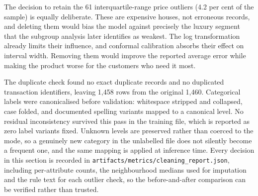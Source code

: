 The decision to retain the 61 interquartile-range price outliers (4.2 per cent of the
sample) is equally deliberate. These are expensive houses, not erroneous records, and
deleting them would bias the model against precisely the luxury segment that the
subgroup analysis later identifies as weakest. The log transformation already limits
their influence, and conformal calibration absorbs their effect on interval width.
Removing them would improve the reported average error while making the product worse
for the customers who need it most.

The duplicate check found no exact duplicate records and no duplicated transaction
identifiers, leaving 1,458 rows from the original 1,460. Categorical labels were
canonicalised before validation: whitespace stripped and collapsed, case folded, and
documented spelling variants mapped to a canonical level. No residual inconsistency
survived this pass in the training file, which is reported as zero label variants
fixed. Unknown levels are preserved rather than coerced to the mode, so a genuinely
new category in the unlabelled file does not silently become a frequent one, and the
same mapping is applied at inference time. Every decision in this section is recorded
in \texttt{artifacts/metrics/cleaning\_report.json}, including per-attribute counts,
the neighbourhood medians used for imputation and the rule text for each outlier
check, so the before-and-after comparison can be verified rather than trusted.
